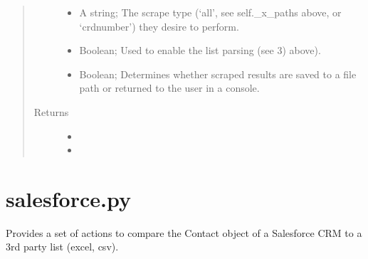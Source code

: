 \documentclass[letterpaper,10pt,english]{sphinxmanual}
\begin{document}
\begin{fulllineitems}
\begin{fulllineitems}
\begin{quote}
\begin{description}
\begin{itemize}
\item {} 
 \textendash{} A string; The scrape type (‘all’, see self.\_x\_paths above, or ‘crdnumber’) they desire to perform.

\item {} 
 \textendash{} Boolean; Used to enable the list parsing (see 3) above).

\item {} 
 \textendash{} Boolean; Determines whether scraped results are saved to a file path or returned to the user in a console.

\end{itemize}

\item[{Returns}] \leavevmode
\begin{itemize}
\item {} 

\item {} 

\end{itemize}


\end{description}\end{quote}

\end{fulllineitems}


\end{fulllineitems}

\label{\detokenize{index:module-ListManagement.search.salesforce}}

\section{salesforce.py}
\label{\detokenize{index:salesforce-py}}
Provides a set of actions to compare the Contact object
of a Salesforce CRM to a 3rd party list (excel, csv).
\end{document}
